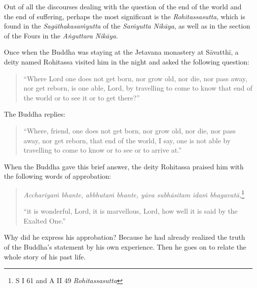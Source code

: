 Out of all the discourses dealing with the question of the end of the world and the end of suffering, perhaps the most significant is the \emph{Rohitassasutta}, which is found in the \emph{Sagāthakasaṁyutta} of the \emph{Saṁyutta Nikāya}, as well as in the section of the Fours in the \emph{Aṅguttara Nikāya}.

Once when the Buddha was staying at the Jetavana monastery at Sāvatthī, a deity named Rohitassa visited him in the night and asked the following question:

\begin{quote}
``Where Lord one does not get born, nor grow old, nor die, nor pass away, nor get reborn, is one able, Lord, by travelling to come to know that end of the world or to see it or to get there?''
\end{quote}

The Buddha replies:

\begin{quote}
``Where, friend, one does not get born, nor grow old, nor die, nor pass away, nor get reborn, that end of the world, I say, one is not able by travelling to come to know or to see or to arrive at.''
\end{quote}

When the Buddha gave this brief answer, the deity Rohitassa praised him with the following words of approbation:

\begin{quote}
\emph{Acchariyaṁ bhante, abbhutaṁ bhante, yāva subhāsitam idaṁ bhagavatā,}\footnote{S I 61 and A II 49 \emph{Rohitassasutta}}

``it is wonderful, Lord, it is marvellous, Lord, how well it is said by the Exalted One.''
\end{quote}

Why did he express his approbation? Because he had already realized the truth of the Buddha's statement by his own experience. Then he goes on to relate the whole story of his past life.

